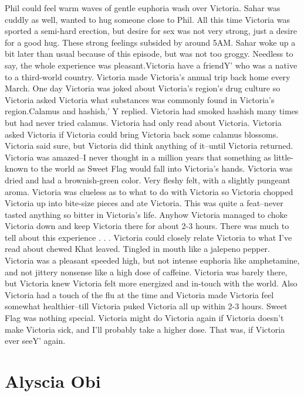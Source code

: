 \documentclass[12pt]{book}
\begin{document}
Phil could feel warm waves of gentle euphoria wash over Victoria. Sahar was cuddly as well, wanted to hug someone close to Phil. All this time Victoria was sported a semi-hard erection, but desire for sex was not very strong, just a desire for a good hug. These strong feelings subsided by around 5AM. Sahar woke up a bit later than usual because of this episode, but was not too groggy. Needless to say, the whole experience was pleasant.Victoria have a friendY' who was a native to a third-world country. Victoria made Victoria's annual trip back home every March. One day Victoria was joked about Victoria's region's drug culture so Victoria asked Victoria what substances was commonly found in Victoria's region.Calamus and hashish,' Y replied. Victoria had smoked hashish many times but had never tried calamus. Victoria had only read about Victoria. Victoria asked Victoria if Victoria could bring Victoria back some calamus blossoms. Victoria said sure, but Victoria did think anything of it--until Victoria returned. Victoria was amazed--I never thought in a million years that something as little-known to the world as Sweet Flag would fall into Victoria's hands. Victoria was dried and had a brownish-green color. Very fleshy felt, with a slightly pungeant aroma. Victoria was clueless as to what to do with Victoria so Victoria chopped Victoria up into bite-size pieces and ate Victoria. This was quite a feat--never tasted anything so bitter in Victoria's life. Anyhow Victoria managed to choke Victoria down and keep Victoria there for about 2-3 hours. There was much to tell about this experience . . .  Victoria could closely relate Victoria to what I've read about chewed Khat leaved. Tingled in mouth like a jalepeno pepper. Victoria was a pleasant speeded high, but not intense euphoria like amphetamine, and not jittery nonsense like a high dose of caffeine. Victoria was barely there, but Victoria knew Victoria felt more energized and in-touch with the world. Also Victoria had a touch of the flu at the time and Victoria made Victoria feel somewhat healthier--till Victoria puked Victoria all up within 2-3 hours. Sweet Flag was nothing special. Victoria might do Victoria again if Victoria doesn't make Victoria sick, and I'll probably take a higher dose. That was, if Victoria ever seeY' again.



\chapter{Alyscia Obi}
\end{document}
